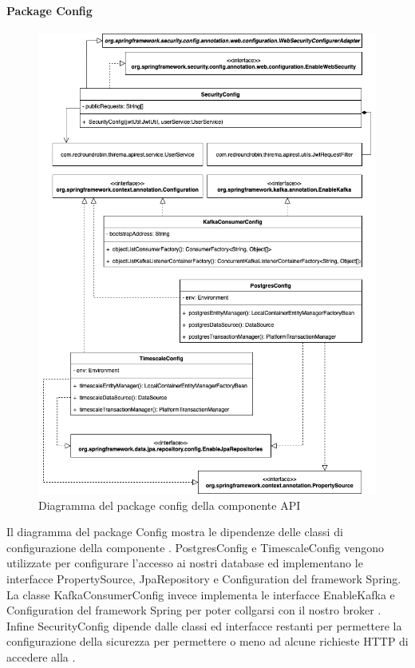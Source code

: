 		\paragraph*{Package Config} 
		\begin{figure}[H]
			\centering
			\includegraphics[scale=0.550]{res/images/API/ConfigPackage.png}
			\caption{Diagramma del package config della componente API}
			\label{Diagramma 12}
		\end{figure}
		Il diagramma del package Config mostra le dipendenze delle classi di configurazione della componente .
		\newline
		PostgresConfig e TimescaleConfig vengono utilizzate per configurare l'accesso ai nostri database ed implementano le interfacce PropertySource, JpaRepository e Configuration del framework Spring.
		\newline
		La classe KafkaConsumerConfig invece implementa le interfacce EnableKafka e Configuration del framework Spring per poter collgarsi con il nostro broker .
		\newline
		Infine SecurityConfig dipende dalle classi ed interfacce restanti per permettere la configurazione della sicurezza per permettere o meno ad alcune richieste HTTP di accedere alla .
		\newpage
